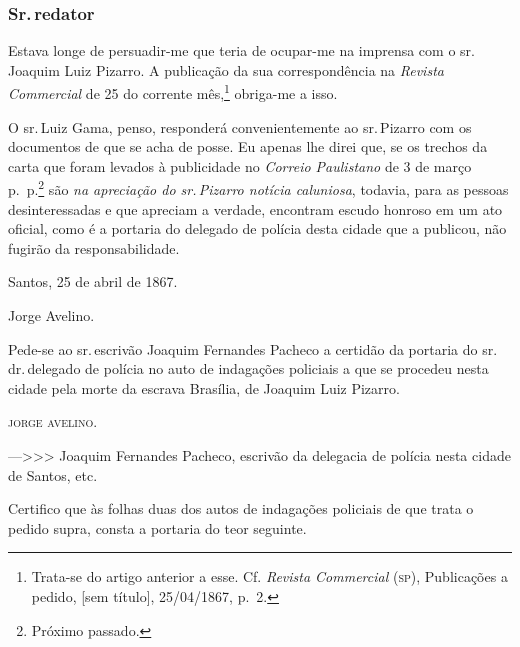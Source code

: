 \subsubsection{Sr.\,redator}

Estava longe de persuadir-me que teria de ocupar-me na imprensa com o
sr.\,Joaquim Luiz Pizarro. A publicação da sua correspondência na
\emph{Revista Commercial} de 25 do corrente mês,\footnote{ Trata-se
  do artigo anterior a esse. Cf. \emph{Revista Commercial} (\textsc{sp}),
  Publicações a pedido, {[}sem título{]}, 25/04/1867, p.~2.} obriga-me a
isso.

O sr.\,Luiz Gama, penso, responderá convenientemente ao sr.\,Pizarro com
os documentos de que se acha de posse. Eu apenas lhe direi que, se os
trechos da carta que foram levados à publicidade no \emph{Correio
Paulistano} de 3 de março p.~p.\textsuperscript{⁠}\footnote{ Próximo
  passado.} são \emph{na apreciação do sr.\,Pizarro notícia caluniosa},
todavia, para as pessoas desinteressadas e que apreciam a verdade,
encontram escudo honroso em um ato oficial, como é a portaria do
delegado de polícia desta cidade que a publicou, não fugirão da
responsabilidade.
\begin{flushright}
Santos, 25 de abril de 1867.

Jorge Avelino.

Pede-se ao sr.\,escrivão Joaquim Fernandes Pacheco a certidão da portaria
do sr.\,dr.\,delegado de polícia no auto de indagações policiais a que se
procedeu nesta cidade pela morte da escrava Brasília, de Joaquim Luiz
Pizarro.

\textsc{jorge avelino}.
\end{flushright}
---\textgreater\textgreater\textgreater{} Joaquim Fernandes Pacheco,
escrivão da delegacia de polícia nesta cidade de Santos, etc.

Certifico que às folhas duas dos autos de indagações policiais
de que trata o pedido supra, consta a portaria do teor seguinte.

